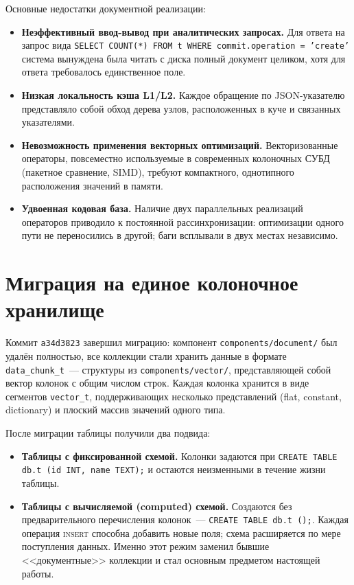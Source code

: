 Основные недостатки документной реализации:
\begin{itemize}
    \item \textbf{Неэффективный ввод-вывод при аналитических
    запросах.} Для ответа на запрос вида \texttt{SELECT COUNT(*)
    FROM t WHERE commit.operation = 'create'} система вынуждена
    была читать с диска полный документ целиком, хотя для ответа
    требовалось единственное поле.
    \item \textbf{Низкая локальность кэша L1/L2.} Каждое
    обращение по JSON-указателю представляло собой обход дерева
    узлов, расположенных в куче и связанных указателями.
    \item \textbf{Невозможность применения векторных
    оптимизаций.} Векторизованные операторы, повсеместно
    используемые в современных колоночных СУБД (пакетное
    сравнение, SIMD), требуют компактного, однотипного
    расположения значений в памяти.
    \item \textbf{Удвоенная кодовая база.} Наличие двух
    параллельных реализаций операторов приводило к постоянной
    рассинхронизации: оптимизации одного пути не переносились в
    другой; баги всплывали в двух местах независимо.
\end{itemize}

\section{Миграция на единое колоночное хранилище}

Коммит \texttt{a34d3823} завершил миграцию: компонент
\texttt{components/document/} был удалён полностью, все коллекции
стали хранить данные в формате \texttt{data\_chunk\_t}~---
структуры из \texttt{components/vector/}, представляющей собой
вектор колонок с общим числом строк. Каждая колонка хранится в
виде сегментов \texttt{vector\_t}, поддерживающих несколько
представлений (flat, constant, dictionary) и плоский массив
значений одного типа.

После миграции таблицы получили два подвида:
\begin{itemize}
    \item \textbf{Таблицы с фиксированной схемой.} Колонки
    задаются при \texttt{CREATE TABLE db.t (id INT, name TEXT);}
    и остаются неизменными в течение жизни таблицы.
    \item \textbf{Таблицы с вычисляемой (computed) схемой.}
    Создаются без предварительного перечисления колонок~---
    \texttt{CREATE TABLE db.t ();}. Каждая операция
    \textsc{insert} способна добавить новые поля; схема
    расширяется по мере поступления данных. Именно этот режим
    заменил бывшие <<документные>> коллекции и стал основным
    предметом настоящей работы.
\end{itemize}

